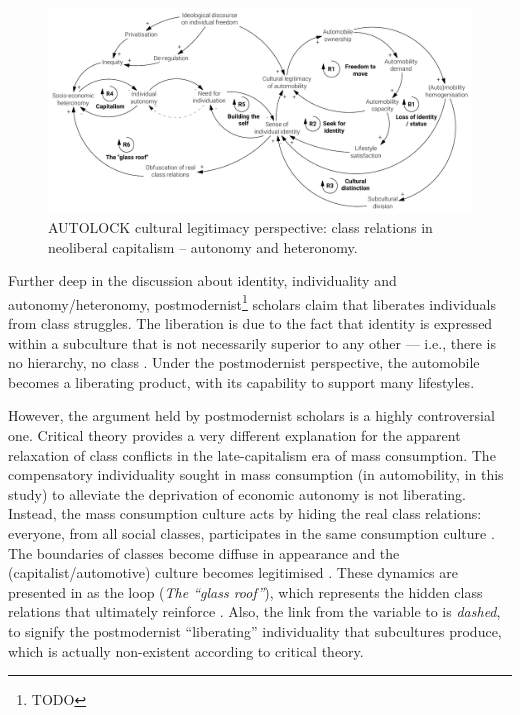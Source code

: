 \begin{figure}
\includegraphics[width=1.2\textwidth,center]{figures/model/cropped/cultural_3_final.pdf}
\caption[AUTOLOCK cultural legitimacy perspective: class relations.]{AUTOLOCK cultural legitimacy perspective: class relations in neoliberal capitalism -- autonomy and heteronomy.}
\label{f:results:cld_culture_3}
\end{figure}

Further deep in the discussion about identity, individuality and autonomy/heteronomy, postmodernist\footnote{TODO} scholars claim that  liberates individuals from class struggles. The liberation is due to the fact that identity is expressed within a subculture that is not necessarily superior to any other --- i.e., there is no hierarchy, no class \parencite{gartman2004_ThreeAgesAutomobile}. Under the postmodernist perspective, the automobile becomes a liberating product, with its capability to support many lifestyles.

However, the argument held by postmodernist scholars is a highly controversial one. Critical theory provides a very different explanation for the apparent relaxation of class conflicts in the late-capitalism era of mass consumption. The compensatory individuality sought in mass consumption (in automobility, in this study) to alleviate the deprivation of economic autonomy is not liberating. Instead, the mass consumption culture acts by hiding the real class relations: everyone, from all social classes, participates in the same consumption culture \parencite{gartman1991_CultureasClass,marcuse2013_OneDimensionalMan}. The boundaries of classes become diffuse in appearance and the (capitalist/automotive) culture becomes legitimised \parencite{gartman2004_ThreeAgesAutomobile}. These dynamics are presented in  as the  loop (\emph{The ``glass roof''}), which represents the hidden class relations that ultimately reinforce . Also, the link from the  variable to  is \emph{dashed}, to signify the postmodernist ``liberating'' individuality that subcultures produce, which is actually non-existent according to critical theory. 


